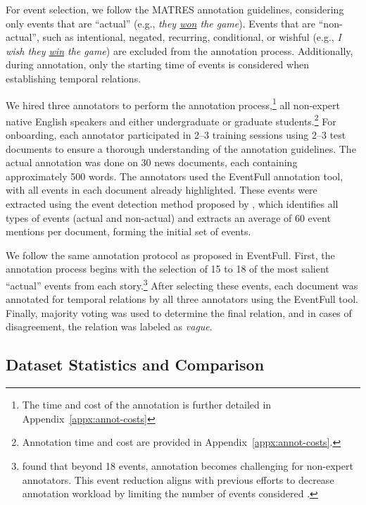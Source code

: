 For event selection, we follow the MATRES annotation guidelines, considering only events that are ``actual'' (e.g., \textit{they \underline{won} the game}). Events that are ``non-actual'', such as intentional, negated, recurring, conditional, or wishful (e.g., \textit{I wish they \underline{win} the game}) are excluded from the annotation process.
Additionally, during annotation, only the starting time of events is considered when establishing temporal relations. 

We hired three annotators to perform the annotation process,\footnote{The time and cost of the annotation is further detailed in Appendix~\ref{appx:annot-costs}} all non-expert native English speakers and either undergraduate or graduate students.\footnote{Annotation time and cost are provided in Appendix~\ref{appx:annot-costs}.} For onboarding, each annotator participated in 2–3 training sessions using 2–3 test documents to ensure a thorough understanding of the annotation guidelines.
The actual annotation was done on 30 news documents, each containing approximately 500 words. The annotators used the EventFull annotation tool, with all events in each document already highlighted. These events were extracted using the event detection method proposed by \citet{cattan-etal-2021-cross-document}, which identifies all types of events (actual and non-actual) and extracts an average of 60 event mentions per document, forming the initial set of events.

We follow the same annotation protocol as proposed in EventFull. First, the annotation process begins with the selection of 15 to 18 of the most salient ``actual'' events from each story.\footnote{\citet{eirew2024eventfullcompleteconsistentevent} found that beyond 18 events, annotation becomes challenging for non-expert annotators. This event reduction aligns with previous efforts to decrease annotation workload by limiting the number of events considered \cite{chambers-etal-2014-dense, ning-etal-2018-multi, tan-etal-2024-set}.} After selecting these events, each document was annotated for temporal relations by all three annotators using the EventFull tool. Finally, majority voting was used to determine the final relation, and in cases of disagreement, the relation was labeled as \textit{vague}.


% 


\subsection{Dataset Statistics and Comparison}
\label{section:dataset:statistics}

